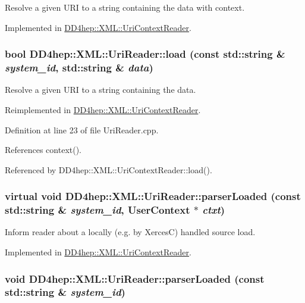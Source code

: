 Resolve a given URI to a string containing the data with context. 

Implemented in \hyperlink{class_d_d4hep_1_1_x_m_l_1_1_uri_context_reader_a4a092a836c08154d7d787f9244701944}{DD4hep::XML::UriContextReader}.\hypertarget{class_d_d4hep_1_1_x_m_l_1_1_uri_reader_a4cb644360608b580a1aaa4ccb9a8c7fa}{
\subsubsection[{load}]{\setlength{\rightskip}{0pt plus 5cm}bool DD4hep::XML::UriReader::load (const std::string \& {\em system\_\-id}, \/  std::string \& {\em data})}}
\label{class_d_d4hep_1_1_x_m_l_1_1_uri_reader_a4cb644360608b580a1aaa4ccb9a8c7fa}


Resolve a given URI to a string containing the data. 

Reimplemented in \hyperlink{class_d_d4hep_1_1_x_m_l_1_1_uri_context_reader_a1a6ca7eb85dadbc69463a367f396fe72}{DD4hep::XML::UriContextReader}.

Definition at line 23 of file UriReader.cpp.

References context().

Referenced by DD4hep::XML::UriContextReader::load().\hypertarget{class_d_d4hep_1_1_x_m_l_1_1_uri_reader_ad04589fb5da7fe238c1a0cf1c8e4f0ac}{
\subsubsection[{parserLoaded}]{\setlength{\rightskip}{0pt plus 5cm}virtual void DD4hep::XML::UriReader::parserLoaded (const std::string \& {\em system\_\-id}, \/  {\bf UserContext} $\ast$ {\em ctxt})}}
\label{class_d_d4hep_1_1_x_m_l_1_1_uri_reader_ad04589fb5da7fe238c1a0cf1c8e4f0ac}


Inform reader about a locally (e.g. by XercesC) handled source load. 

Implemented in \hyperlink{class_d_d4hep_1_1_x_m_l_1_1_uri_context_reader_ad55127447ec6782a4bf610ea2a33e233}{DD4hep::XML::UriContextReader}.\hypertarget{class_d_d4hep_1_1_x_m_l_1_1_uri_reader_a58d5ece4bc5ee3b5d1d8f9eac85baecd}{
\subsubsection[{parserLoaded}]{\setlength{\rightskip}{0pt plus 5cm}void DD4hep::XML::UriReader::parserLoaded (const std::string \& {\em system\_\-id})}}
\label{class_d_d4hep_1_1_x_m_l_1_1_uri_reader_a58d5ece4bc5ee3b5d1d8f9eac85baecd}


